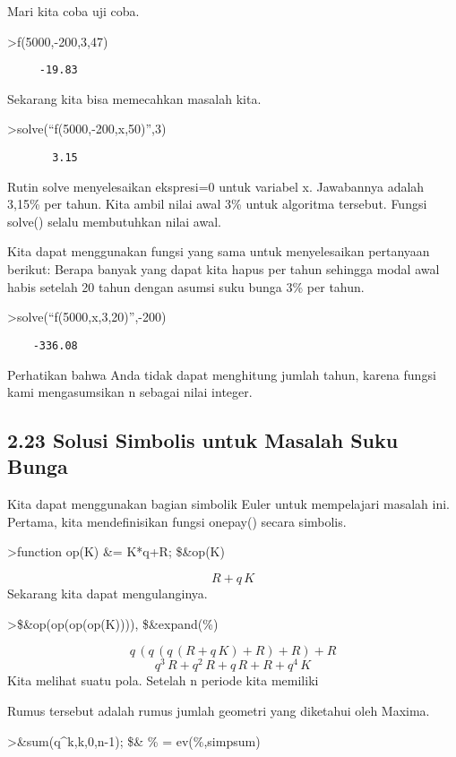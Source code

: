 \documentclass[
]{book}
\begin{document}
Mari kita coba uji coba.

\textgreater f(5000,-200,3,47)

\begin{verbatim}
     -19.83 
\end{verbatim}

Sekarang kita bisa memecahkan masalah kita.

\textgreater solve(``f(5000,-200,x,50)'',3)

\begin{verbatim}
       3.15 
\end{verbatim}

Rutin solve menyelesaikan ekspresi=0 untuk variabel x. Jawabannya adalah 3,15\% per tahun. Kita ambil nilai awal 3\% untuk algoritma tersebut. Fungsi solve() selalu membutuhkan nilai awal.

Kita dapat menggunakan fungsi yang sama untuk menyelesaikan pertanyaan berikut: Berapa banyak yang dapat kita hapus per tahun sehingga modal awal habis setelah 20 tahun dengan asumsi suku bunga 3\% per tahun.

\textgreater solve(``f(5000,x,3,20)'',-200)

\begin{verbatim}
    -336.08 
\end{verbatim}

Perhatikan bahwa Anda tidak dapat menghitung jumlah tahun, karena fungsi kami mengasumsikan n sebagai nilai integer.

\subsection{2.23 Solusi Simbolis untuk Masalah Suku Bunga}\label{solusi-simbolis-untuk-masalah-suku-bunga}

Kita dapat menggunakan bagian simbolik Euler untuk mempelajari masalah ini. Pertama, kita mendefinisikan fungsi onepay() secara simbolis.

\textgreater function op(K) \&= K*q+R; \$\&op(K)

\[R+q\,K\]Sekarang kita dapat mengulanginya.

\textgreater\$\&op(op(op(op(K)))), \$\&expand(\%)

\[q\,\left(q\,\left(q\,\left(R+q\,K\right)+R\right)+R\right)+R\] \[q^3\,R+q^2\,R+q\,R+R+q^4\,K\]Kita melihat suatu pola. Setelah n periode kita memiliki

Rumus tersebut adalah rumus jumlah geometri yang diketahui oleh Maxima.

\textgreater\&sum(q\^{}k,k,0,n-1); \$\& \% = ev(\%,simpsum)
\end{document}

